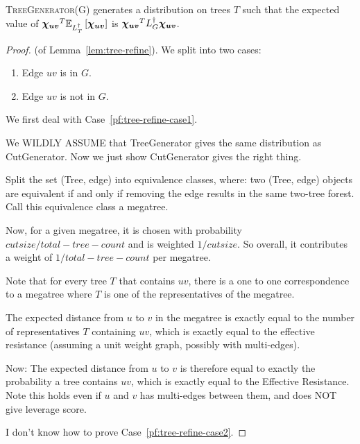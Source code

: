 \begin{lemma} \label{lem:tree-refine} \textsc{TreeGenerator(G)}
  generates a distribution on
  trees $T$ such that the expected value of $\boldsymbol{\chi_{uv}}^T {\mathbb{E}}_{L_T^\dag}\left[ \boldsymbol{\chi_{uv}} \right]$ is $\boldsymbol{\chi_{uv}}^T L_G^\dag \boldsymbol{\chi_{uv}}$.
\end{lemma}

\begin{proof} (of Lemma~\ref{lem:tree-refine}).
  We split into two cases:
  \begin{enumerate}
    \item \label{pf:tree-refine-case1} Edge $uv$ is in $G$.
    \item \label{pf:tree-refine-case2} Edge $uv$ is not in $G$.
  \end{enumerate}
  We first deal with Case~\ref{pf:tree-refine-case1}. 

  We WILDLY ASSUME that TreeGenerator gives the same distribution as
  CutGenerator. Now we just show CutGenerator gives the right thing.

  Split the set (Tree, edge) into equivalence classes, where: two
  (Tree, edge) objects are equivalent if and only if removing the edge
  results in the same two-tree forest. Call this equivalence class a
  megatree.

  Now, for a given megatree, it is chosen with probability $cut size /
  total-tree-count$
  and is weighted $1/cut size$. So overall, it contributes a weight of
  $1/total-tree-count$ per megatree.

  Note that for every tree $T$ that contains $uv$, there is a one to one
  correspondence to a megatree where $T$ is one of the representatives
  of the megatree.

  The expected distance from $u$ to $v$ in the megatree is exactly equal
  to the number of representatives $T$ containing $uv$, which is exactly
  equal to the effective resistance (assuming a unit weight graph,
  possibly with multi-edges).
  
  Now: The expected distance from $u$ to $v$ is therefore equal to
  exactly the probability a tree contains $uv$, which is exactly equal
  to the Effective Resistance. Note this holds even if $u$ and $v$ has
  multi-edges between them, and does NOT give leverage score.

  I don't know how to prove Case~\ref{pf:tree-refine-case2}.
\end{proof}

